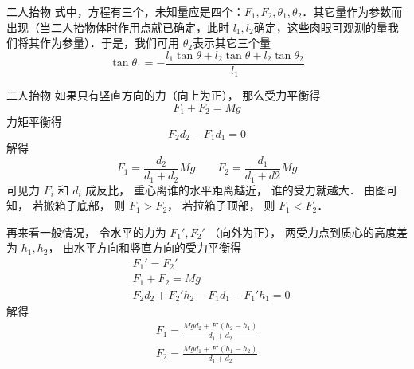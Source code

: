 \begin{example}{二人抬物}
式中，方程有三个，未知量应是四个：$F_1,F_2,\theta_1,\theta_2$．其它量作为参数而出现（当二人抬物体时作用点就已确定，此时 $l_1,l_2$确定，这些肉眼可观测的量我们将其作为参量）．于是，我们可用 $\theta_2$表示其它三个量
\begin{equation}
\tan\theta_1=-\frac {l_1
 \tan  \theta +l_2\tan\theta +l_2\tan
\theta_2}{l_1}
\end{equation}
\end{example}

\begin{example}{二人抬物}
如果只有竖直方向的力（向上为正）， 那么受力平衡得
\begin{equation}
F_1 + F_2 = Mg
\end{equation}
力矩平衡得
\begin{equation}
F_2 d_2 - F_1 d_1 = 0
\end{equation}
解得
\begin{equation}
F_1 = \frac{d_2}{d_1 + d_2}Mg \qquad F_2 = \frac{d_1}{d_1 + d2}Mg
\end{equation}
可见力 $F_i$ 和 $d_i$ 成反比， 重心离谁的水平距离越近， 谁的受力就越大． 由图可知， 若搬箱子底部， 则 $F_1 > F_2$， 若拉箱子顶部， 则 $F_1 < F_2$．

再来看一般情况， 令水平的力为 $F_1', F_2'$ （向外为正）， 两受力点到质心的高度差为 $h_1, h_2$， 由水平方向和竖直方向的受力平衡得
\begin{equation}
\begin{aligned}
&F_1' = F_2'\\
&F_1 + F_2 = Mg\\
&F_2 d_2 + F_2' h_2 - F_1 d_1 - F_1' h_1 = 0
\end{aligned}
\end{equation}
解得
\begin{equation}
\begin{aligned}
F_1 = \frac{Mg d_2 + F'(h_2 - h_1)}{d_1 + d_2}\\
F_2 = \frac{Mg d_1 + F'(h_1 - h_2)}{d_1 + d_2}
\end{aligned}
\end{equation}
\end{example}
